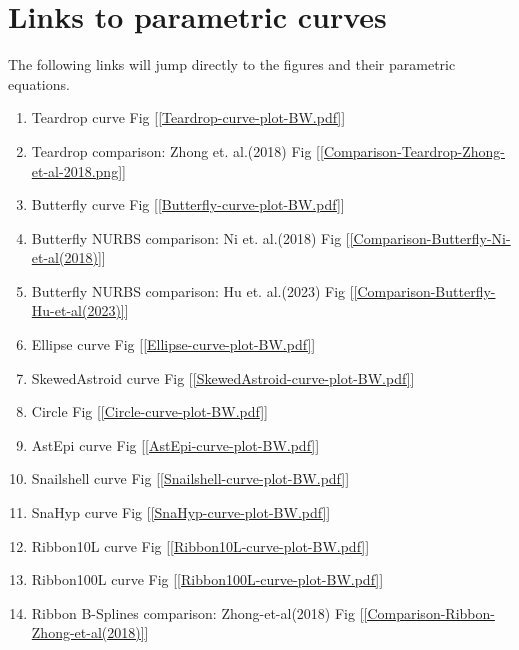 \clearpage
\pagebreak

\section{Links to parametric curves}

\noindent
The following links will jump directly to the figures and their parametric equations.

\begin{enumerate}
	\item Teardrop curve Fig [\ref{Teardrop-curve-plot-BW.pdf}]
	
	\item Teardrop comparison: Zhong et. al.(2018) Fig [\ref{Comparison-Teardrop-Zhong-et-al-2018.png}]
	
	\item Butterfly curve Fig [\ref{Butterfly-curve-plot-BW.pdf}]
	
	\item Butterfly NURBS comparison: Ni et. al.(2018) Fig [\ref{Comparison-Butterfly-Ni-et-al(2018)}]
	
	\item Butterfly NURBS comparison: Hu et. al.(2023) Fig [\ref{Comparison-Butterfly-Hu-et-al(2023)}]
	
	\item Ellipse curve Fig [\ref{Ellipse-curve-plot-BW.pdf}]
	
	\item SkewedAstroid curve Fig [\ref{SkewedAstroid-curve-plot-BW.pdf}]
	
	\item Circle Fig [\ref{Circle-curve-plot-BW.pdf}]
	
	\item AstEpi curve Fig [\ref{AstEpi-curve-plot-BW.pdf}]
	
	\item Snailshell curve Fig [\ref{Snailshell-curve-plot-BW.pdf}]
	
	\item SnaHyp curve Fig [\ref{SnaHyp-curve-plot-BW.pdf}]
	
	\item Ribbon10L curve Fig [\ref{Ribbon10L-curve-plot-BW.pdf}]
	
	\item Ribbon100L curve Fig [\ref{Ribbon100L-curve-plot-BW.pdf}]
	
	\item Ribbon B-Splines comparison: Zhong-et-al(2018) Fig [\ref{Comparison-Ribbon-Zhong-et-al(2018)}]
	
	
\end{enumerate}



